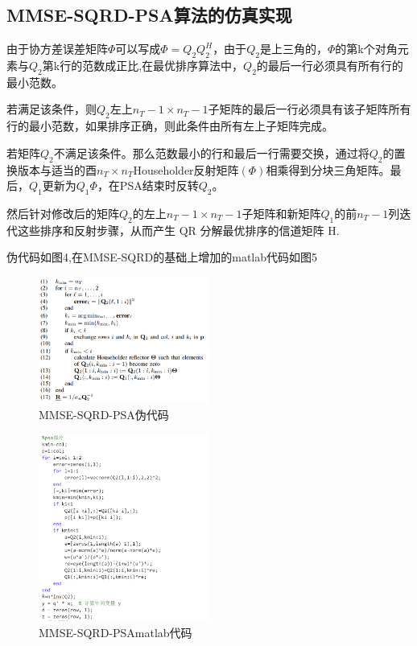 \documentclass[a4paper,12pt]{article}
\begin{document}
	\subsection{MMSE-SQRD-PSA算法的仿真实现}
	由于协方差误差矩阵$\Phi$可以写成$\Phi=Q_2Q_2^H$，由于$Q_2$是上三角的，$\Phi$的第k个对角元素与$Q_2$第k行的范数成正比,在最优排序算法中，$Q_2$的最后一行必须具有所有行的最小范数。\par 
	若满足该条件，则$Q_2$左上$n_T-1\times n_T-1$子矩阵的最后一行必须具有该子矩阵所有行的最小范数，如果排序正确，则此条件由所有左上子矩阵完成。\par 
	若矩阵$Q_2$不满足该条件。那么范数最小的行和最后一行需要交换，通过将$Q_2$的置换版本与适当的酉$n_T\times n_T$Householder反射矩阵$(\Phi)$相乘得到分块三角矩阵。最后，$Q_1$更新为$Q_1\Phi$，在PSA结束时反转$Q_2$。\par 
	然后针对修改后的矩阵$Q_2$的左上$n_T-1\times n_T-1$子矩阵和新矩阵$Q_1$的前$n_T-1$列迭代这些排序和反射步骤，从而产生 QR 分解最优排序的信道矩阵 H.\par 
	伪代码如图4,在MMSE-SQRD的基础上增加的matlab代码如图5
	\newpage
	\begin{figure}[h]
		\centering
		\includegraphics[width=0.5\textwidth]{5.png}
		\caption{MMSE-SQRD-PSA伪代码}
	\end{figure}
	\begin{figure}[h]
		\centering
		\includegraphics[width=0.5\textwidth]{6.png}
		\caption{MMSE-SQRD-PSAmatlab代码}
	\end{figure}
\end{document}
